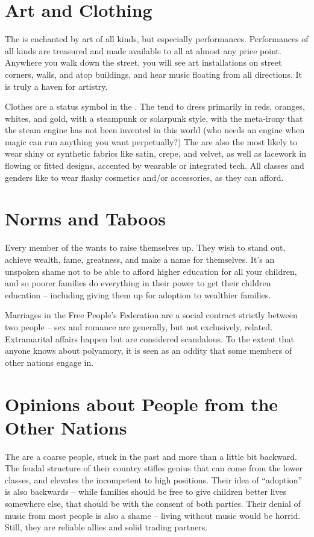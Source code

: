 \documentclass[blue]{GL2020}
\begin{document}
\section*{Art and Clothing}
The \pTech{} is enchanted by art of all kinds, but especially performances.  Performances of all kinds are treasured and made available to all at almost any price point. Anywhere you walk down the street, you will see art installations on street corners, walls, and atop buildings, and hear music floating from all directions.  It is truly a haven for artistry.

Clothes are a status symbol in the \pTech{}. The \pTechies{} tend to dress primarily in reds, oranges, whites, and gold, with a steampunk or solarpunk style, with the meta-irony that the steam engine has not been invented in this world (who needs an engine when magic can run anything you want perpetually?) The \pTechies{} are also the most likely to wear shiny or synthetic fabrics like satin, crepe, and velvet, as well as lacework in flowing or fitted designs, accented by wearable or integrated tech.  All classes and genders like to wear flashy cosmetics and/or accessories, as they can afford.

\section*{Norms and Taboos}
Every member of the \pTech{} wants to raise themselves up. They wish to stand out, achieve wealth, fame, greatness, and make a name for themselves.  It's an unspoken shame not to be able to afford higher education for all your children, and so poorer families do everything in their power to get their children education -- including giving them up for adoption to wealthier families.  

Marriages in the Free People's Federation are a social contract strictly between two people – sex and romance are generally, but not exclusively, related. Extramarital affairs happen but are considered scandalous. To the extent that anyone knows about polyamory, it is seen as an oddity that some members of other nations engage in.

\section*{Opinions about People from the Other Nations}
The \pFarmers{} are a coarse people, stuck in the past and more than a little bit backward.  The feudal structure of their country stifles genius that can come from the lower classes, and elevates the incompetent to high positions.  Their idea of ``adoption'' is also backwards -- while families should be free to give children better lives somewhere else, that should be with the consent of both parties.  Their denial of music from most people is also a shame -- living without music would be horrid.  Still, they are reliable allies and solid trading partners. 
\end{document}
